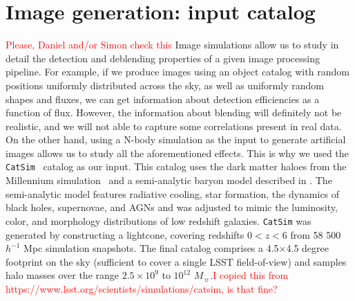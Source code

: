 \documentclass[\docopts]{\docclass}
\begin{document}
\section{Image generation: input catalog}
\label{sec:inputs}
\textcolor{red}{Please, Daniel and/or Simon check this}
Image simulations allow us to study in detail the detection and deblending properties of a given image processing pipeline. For example, if we produce images using an object catalog with random positions uniformly distributed across the sky, as well as uniformly random shapes and fluxes, we can get information about detection efficiencies as a function of flux.  However, the information about blending will definitely not be realistic, and we will not able to capture some correlations present in real data. On the other hand, using a N-body simulation as the input to generate artificial images allows us to study all the aforementioned effects. This is why we used the \texttt{CatSim}~\citep{2014SPIE.9150E..14C} catalog as our input. This catalog uses the dark matter haloes from the Millennium simulation~\citep{2005Nature.435.629S} and a semi-analytic baryon model described in \citet{2006MNRAS.366..499D}. The semi-analytic model features radiative cooling, star formation, the dynamics of black holes, supernovae, and AGNs and was adjusted to mimic the luminosity, color, and morphology distributions of low redshift galaxies.  \texttt{CatSim} was generated by constructing a lightcone, covering redshifts $0<z<6$ from 58 500 $h^{-1}$ Mpc simulation snapshots. The final catalog comprises a 4.5$\times$4.5 degree footprint on the sky (sufficient to cover a single LSST field-of-view) and samples halo masses over the range $2.5\times10^{9}$ to $10^{12}$ $M_{\sun}$.\textcolor{red}{I copied this from https://www.lsst.org/scientists/simulations/catsim, is that fine?}
\end{document}

